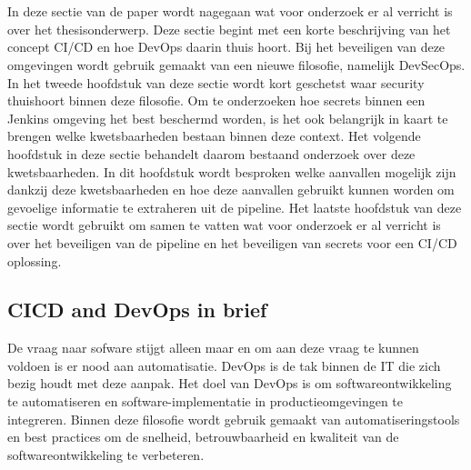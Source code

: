 \chapter{}%
\label{ch:stand-van-zaken}



In deze sectie van de paper wordt nagegaan wat voor onderzoek er al verricht is over het thesisonderwerp. Deze sectie begint met een korte beschrijving van het concept CI/CD en hoe DevOps daarin thuis hoort. Bij het beveiligen van deze omgevingen wordt gebruik gemaakt van een nieuwe filosofie, namelijk DevSecOps. In het tweede hoofdstuk van deze sectie wordt kort geschetst waar security thuishoort binnen deze filosofie. Om te onderzoeken hoe secrets binnen een Jenkins omgeving het best beschermd worden, is het ook belangrijk in kaart te brengen welke kwetsbaarheden bestaan binnen deze context. Het volgende hoofdstuk in deze sectie behandelt daarom bestaand onderzoek over deze kwetsbaarheden. In dit hoofdstuk wordt besproken welke aanvallen mogelijk zijn dankzij deze kwetsbaarheden en hoe deze aanvallen gebruikt kunnen worden om gevoelige informatie te extraheren uit de pipeline. Het laatste hoofdstuk van deze sectie wordt gebruikt om samen te vatten wat voor onderzoek er al verricht is over het beveiligen van de pipeline en het beveiligen van secrets voor een CI/CD oplossing.

\section{
{CICD and DevOps in brief}}
\label{sec:CICD em DevOps in het kort}

De vraag naar sofware stijgt alleen maar en om aan deze vraag te kunnen voldoen is er nood aan automatisatie. DevOps is de tak binnen de IT die zich bezig houdt met deze aanpak. Het doel van DevOps is om softwareontwikkeling te automatiseren en software-implementatie in productieomgevingen te integreren. Binnen deze filosofie wordt gebruik gemaakt van automatiseringstools en best practices om de snelheid, betrouwbaarheid en kwaliteit van de softwareontwikkeling te verbeteren.
\clearpage

